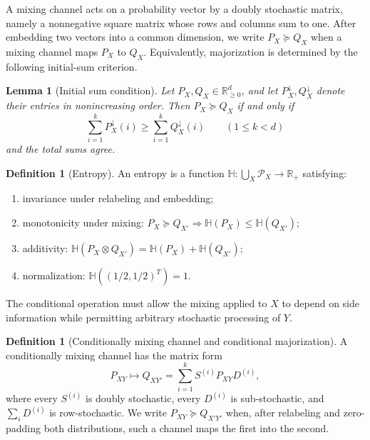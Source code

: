 \documentclass[aps,pra,11pt,onecolumn,nofootinbib,tightenlines]{revtex4-2}
\newtheorem{lemma}[theorem]{Lemma}
\theoremstyle{definition}
\newtheorem{definition}[theorem]{Definition}
\renewcommand{\H}{\mathbb{H}}
\newcommand{\R}{\mathbb{R}}
\newcommand{\mc}[1]{\mathcal{#1}}
\begin{document}
A mixing channel acts on a probability vector by a doubly stochastic matrix,
namely a nonnegative square matrix whose rows and columns sum to one.  After
embedding two vectors into a common dimension, we write $P_X\succeq Q_X$ when
a mixing channel maps $P_X$ to $Q_X$.  Equivalently, majorization is determined
by the following initial-sum criterion.

\begin{lemma}[Initial sum condition]
\label{lem: Initial sum condition}
Let $P_X,Q_X\in\R^d_{\geq0}$, and let $P_X^\downarrow,Q_X^\downarrow$ denote
their entries in nonincreasing order.  Then $P_X\succeq Q_X$ if and only if
\begin{equation}
 \sum_{i=1}^kP_X^\downarrow(i)\geq
 \sum_{i=1}^kQ_X^\downarrow(i)\qquad(1\leq k<d)
\end{equation}
and the total sums agree.
\end{lemma}

\begin{definition}[Entropy]
\label{def: Entropy}
An entropy is a function
$\H:\bigcup_X\mc P_X\to\R_+$ satisfying:
\begin{enumerate}[itemsep=1pt]
 \item invariance under relabeling and embedding;
 \label{eq:E-2nd-postulate-iso}
 \item monotonicity under mixing:
 $P_X\succeq Q_{X'}\Rightarrow\H(P_X)\leq\H(Q_{X'})$;
 \label{eq:E-1st-postulate-mono}
 \item additivity:
 $\H(P_X\otimes Q_{X'})=\H(P_X)+\H(Q_{X'})$;
 \label{eq:E-2nd-postulate-add}
 \item normalization: $\H((1/2,1/2)^T)=1$.
 \label{eq:E-4-postulate-normalization}
\end{enumerate}
\end{definition}

The conditional operation must allow the mixing applied to $X$ to depend on
side information while permitting arbitrary stochastic processing of $Y$.

\begin{definition}[Conditionally mixing channel and conditional majorization]
\label{def:cond-maj-cond-mix}
A conditionally mixing channel has the matrix form
\begin{equation}
 P_{XY}\longmapsto Q_{XY'}=\sum_{i=1}^kS^{(i)}P_{XY}D^{(i)},
 \label{eq:intro/mixing}
\end{equation}
where every $S^{(i)}$ is doubly stochastic, every $D^{(i)}$ is
sub-stochastic, and $\sum_iD^{(i)}$ is row-stochastic.  We write
$P_{XY}\succeq Q_{X'Y'}$ when, after relabeling and zero-padding both
distributions, such a channel maps the first into the second.
\end{definition}
\end{document}
